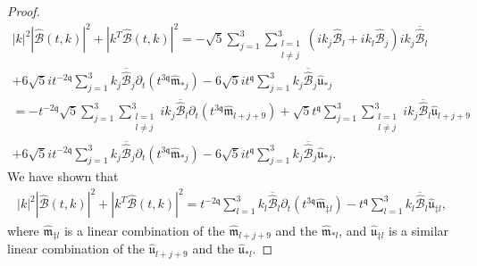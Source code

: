\documentclass[10pt,a4paper]{amsart}
\newcommand{\qq}{\mathfrak{q}}
\newcommand{\tTq}{t^{3\qq}}
\newcommand{\tq}{t^{\qq}}
\begin{document}
\begin{proof}
\begin{multline*}
    |k|^2 |\widehat{\mathcal{B}}(t,k)|^2 + |k^T\widehat{\mathcal{B}}(t,k)|^2
    =
    -\sqrt{5}\sum_{j=1}^3\sum_{\substack{l=1 \\ l\neq j}}^3 \left(ik_j \widehat{\mathcal{B}}_l+ik_l \widehat{\mathcal{B}}_j \right)ik_j \overline{\widehat{\mathcal{B}}}_l
    \\
    +
6\sqrt{5}it^{-2\qq} 
\sum_{j=1}^3 
k_j\overline{\widehat{\mathcal{B}}}_j\partial_t\left( \tTq \widehat{\mathfrak{m}}_{*j} \right)
-
6\sqrt{5}i\tq
\sum_{j=1}^3
k_j \overline{\widehat{\mathcal{B}}}_j\widehat{\mathfrak{u}}_{*j}
\\
=
- t^{-2\qq}  \sqrt{5} \sum_{j=1}^3\sum_{\substack{l=1 \\ l\neq j}}^3 ik_j \overline{\widehat{\mathcal{B}}}_l\partial_t\left( \tTq \widehat{\mathfrak{m}}_{l+j+9} \right)
+
\sqrt{5}\tq\sum_{j=1}^3\sum_{\substack{l=1 \\ l\neq j}}^3 ik_j \overline{\widehat{\mathcal{B}}}_l \hat{\mathfrak{u}}_{l+j+9}
    \\
    +
6\sqrt{5}it^{-2\qq} 
\sum_{j=1}^3 
k_j\overline{\widehat{\mathcal{B}}}_j\partial_t\left( \tTq \widehat{\mathfrak{m}}_{*j} \right)
-
6\sqrt{5}i\tq
\sum_{j=1}^3
k_j \overline{\widehat{\mathcal{B}}}_j\widehat{\mathfrak{u}}_{*j}.
\end{multline*}
We have shown that 
\begin{align*}
    |k|^2 |\widehat{\mathcal{B}}(t,k)|^2 + |k^T\widehat{\mathcal{B}}(t,k)|^2
    =
t^{-2\qq} 
\sum_{l=1}^3 
k_l\overline{\widehat{\mathcal{B}}}_l\partial_t\left( \tTq \widehat{\mathfrak{m}}_{\ddagger l} \right)
-
\tq
\sum_{l=1}^3
k_l \overline{\widehat{\mathcal{B}}}_l \widehat{\mathfrak{u}}_{\ddagger l},
\end{align*}
where $\widehat{\mathfrak{m}}_{\ddagger l}$ is a linear combination of the $\widehat{\mathfrak{m}}_{l+j+9}$ and the $\widehat{\mathfrak{m}}_{*l}$, 
and $\widehat{\mathfrak{u}}_{\ddagger l}$ is a similar linear combination of the $\widehat{\mathfrak{u}}_{l+j+9}$ and the $\widehat{\mathfrak{u}}_{*l}$. 




\end{proof}
\end{document}
